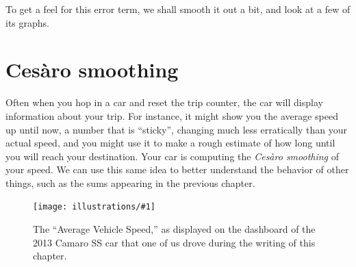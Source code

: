 \documentclass[openany]{book}
\newcommand{\ill}[3]{%
   \begin{figure}[H]%
   \vspace{-2ex}
   \centering%
   \texttt{[image: illustrations/\#1]}%
   \caption{#3}%
   \vspace{-2ex}
    \end{figure}}
\theoremstyle{plain}
\theoremstyle{definition}
\begin{document}
   To get a feel for this error term, we shall smooth it out a bit, and look at a few of its graphs.


\chapter{Ces\`aro smoothing}\label{ces}

Often when you hop in a car and reset the trip counter, the car
will display information about your trip.  For instance, it might show you the
average speed up until now, a number that is
``sticky'', changing much less erratically than your
actual speed, and you might use it to make a rough estimate of
how long until you will reach your destination.
Your car is computing the {\em Ces\`aro smoothing }of your speed.
We can use this same idea to better understand the behavior
of other things, such as the sums appearing in
the previous chapter.
\ill{camaro}{.7}{The ``Average Vehicle Speed,'' as displayed on the dashboard of the 2013 Camaro SS car that one of us drove during the writing of this chapter.}
\end{document}
